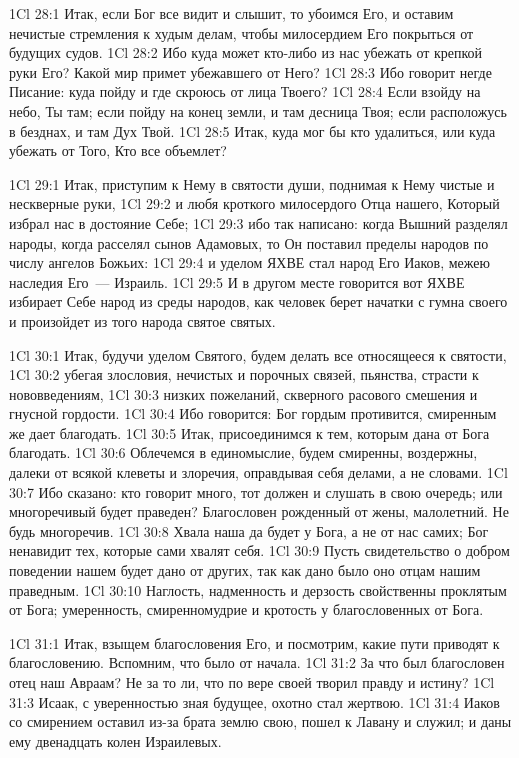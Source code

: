 \vs 1Cl 28:1
Итак, если Бог все видит
и слышит, то убоимся Его, и оставим нечистые стремления к худым делам, чтобы
милосердием Его покрыться от будущих судов.
\vs 1Cl 28:2
Ибо куда может кто-либо из
нас убежать от крепкой руки Его? Какой мир примет убежавшего от Него?
\vs 1Cl 28:3
Ибо говорит негде Писание:
куда пойду и где скроюсь от лица Твоего?
\vs 1Cl 28:4
Если взойду на небо, Ты
там; если пойду на конец земли, и там десница Твоя; если расположусь в
безднах, и там Дух Твой.
\vs 1Cl 28:5
Итак, куда мог бы кто
удалиться, или куда убежать от Того, Кто все объемлет?

\vs 1Cl 29:1
Итак, приступим к Нему в
святости души, поднимая к Нему чистые и нескверные руки,
\vs 1Cl 29:2
и любя кроткого
милосердого Отца нашего, Который избрал нас в достояние Себе;
\vs 1Cl 29:3
ибо так написано: когда
Вышний разделял народы, когда расселял сынов Адамовых, то Он поставил пределы
народов по числу ангелов Божьих:
\vs 1Cl 29:4
и уделом ЯХВЕ стал народ
Его Иаков, межею наследия Его~--- Израиль.
\vs 1Cl 29:5
И в другом месте говорится
вот ЯХВЕ избирает Себе народ из среды народов, как человек берет начатки с
гумна своего и произойдет из того народа святое святых.

\vs 1Cl 30:1
Итак, будучи уделом
Святого, будем делать все относящееся к святости,
\vs 1Cl 30:2
убегая злословия, нечистых
и порочных связей, пьянства, страсти к нововведениям,
\vs 1Cl 30:3
низких пожеланий,
скверного расового смешения и гнусной гордости.
\vs 1Cl 30:4
Ибо говорится: Бог гордым
противится, смиренным же дает благодать.
\vs 1Cl 30:5
Итак, присоединимся к тем,
которым дана от Бога благодать.
\vs 1Cl 30:6
Облечемся в единомыслие,
будем смиренны, воздержны, далеки от всякой клеветы и злоречия, оправдывая
себя делами, а не словами.
\vs 1Cl 30:7
Ибо сказано: кто говорит
много, тот должен и слушать в свою очередь; или многоречивый будет праведен?
Благословен рожденный от жены, малолетний. Не будь многоречив.
\vs 1Cl 30:8
Хвала наша да будет у
Бога, а не от нас самих; Бог ненавидит тех, которые сами хвалят себя.
\vs 1Cl 30:9
Пусть свидетельство о
добром поведении нашем будет дано от других, так как дано было оно отцам нашим
праведным.
\vs 1Cl 30:10
Наглость, надменность и
дерзость свойственны проклятым от Бога; умеренность, смиренномудрие и кротость
у благословенных от Бога.

\vs 1Cl 31:1
Итак, взыщем
благословения Его, и посмотрим, какие пути приводят к благословению. Вспомним,
что было от начала.
\vs 1Cl 31:2
За что был благословен
отец наш Авраам? Не за то ли, что по вере своей творил правду и истину?
\vs 1Cl 31:3
Исаак, с уверенностью зная
будущее, охотно стал жертвою.
\vs 1Cl 31:4
Иаков со смирением оставил
из-за брата землю свою, пошел к Лавану и служил; и даны ему двенадцать колен
Израилевых.

